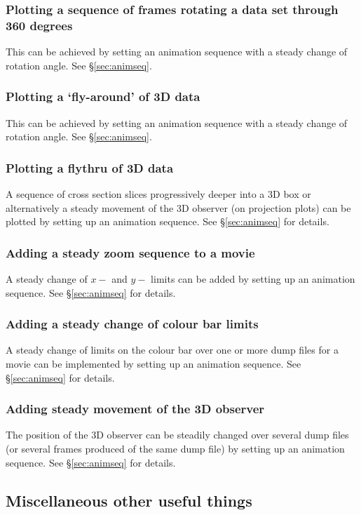 \documentclass[a4paper,11pt]{article}
\begin{document}
\subsubsection{ Plotting a sequence of frames rotating a data set through 360 degrees}
This can be achieved by setting an animation sequence with a steady change of rotation angle. See \S\ref{sec:animseq}.

\subsubsection{ Plotting a `fly-around' of 3D data}
This can be achieved by setting an animation sequence with a steady change of rotation angle. See \S\ref{sec:animseq}.

\subsubsection{ Plotting a flythru of 3D data}
 A sequence of cross section slices progressively deeper into a 3D box or alternatively a steady movement of the 3D observer (on projection plots) can be plotted by setting up an animation sequence. See \S\ref{sec:animseq} for details.

\subsubsection{ Adding a steady zoom sequence to a movie}
 A steady change of $x-$ and $y-$ limits can be added by setting up an animation sequence. See \S\ref{sec:animseq} for details.

\subsubsection{ Adding a steady change of colour bar limits}
 A steady change of limits on the colour bar over one or more dump files for a movie can be implemented by setting up an animation sequence. See \S\ref{sec:animseq} for details.

\subsubsection{ Adding steady movement of the 3D observer}
\label{sec:move3Dobserver}
 The position of the 3D observer can be steadily changed over several dump files (or several frames produced of the same dump file) by setting up an animation sequence.  See \S\ref{sec:animseq} for details.

\subsection{Miscellaneous other useful things}
\end{document}
